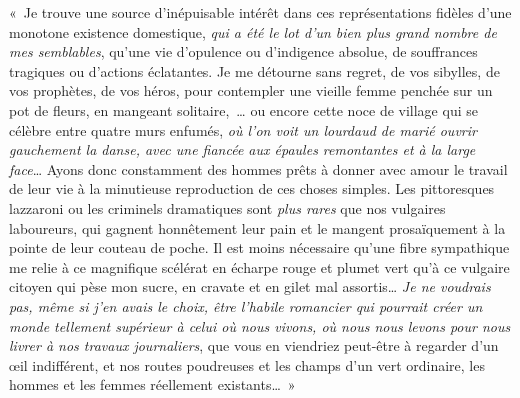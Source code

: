 \documentclass[french,twoside]{book} %
\newenvironment{quoteblock}%
  {\begin{quoting}}
  {\end{quoting}}
\newenvironment{quotebar}{%
    \def\FrameCommand{{\color{rubric!10!}\vrule width 0.5em} \hspace{0.9em}}%
    \def\OuterFrameSep{\itemsep} %
    \MakeFramed {\advance\hsize-\width \FrameRestore}
  }%
  {%
    \endMakeFramed
  }
\renewenvironment{quoteblock}%
  {%
    \savenotes
    \setstretch{0.9}
    \normalfont
    \begin{quotebar}
  }
  {%
    \end{quotebar}
    \spewnotes
  }
\begin{document}
\begin{quoteblock}
 \noindent « Je trouve une source d’inépuisable intérêt dans ces représentations fidèles d’une monotone existence domestique, \emph{qui a été le lot d’un bien plus grand nombre de mes semblables}, qu’une vie d’opulence ou d’indigence absolue, de souffrances tragiques ou d’actions éclatantes. Je me détourne sans regret, de vos sibylles, de vos prophètes, de vos héros, pour contempler une vieille femme penchée sur un pot de fleurs, en mangeant solitaire, … ou encore cette noce de village qui se célèbre entre quatre murs enfumés, \emph{où l’on voit un lourdaud de marié ouvrir gauchement la danse, avec une fiancée aux épaules remontantes et à la large face}… Ayons donc constamment des hommes prêts à donner avec amour le travail de leur vie à la minutieuse reproduction de ces choses simples. Les pittoresques lazzaroni ou les criminels dramatiques sont \emph{plus rares} que nos vulgaires laboureurs, qui gagnent honnêtement leur pain et le mangent prosaïquement à la pointe de leur couteau de poche. Il est moins nécessaire qu’une fibre sympathique me relie à ce magnifique scélérat en écharpe rouge et plumet vert qu’à ce vulgaire citoyen qui pèse mon sucre, en cravate et en gilet mal assortis… \emph{Je ne voudrais pas, même si j’en avais le choix, être l’habile romancier qui pourrait créer un monde tellement supérieur à celui où nous vivons, où nous nous levons pour nous livrer à nos travaux journaliers}, que vous en viendriez peut-être à regarder d’un œil indifférent, et nos routes poudreuses et les champs d’un vert ordinaire, les hommes et les femmes réellement existants… »
 \end{quoteblock}
\end{document}
